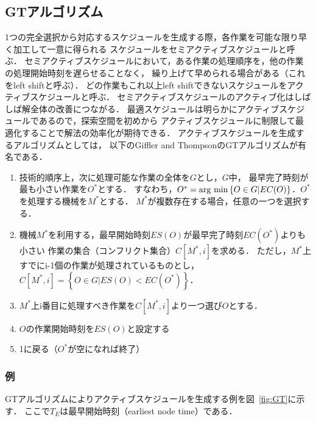 \documentclass{jsarticle}
\newcommand{\argmin}{\mathop{\rm arg~min}\limits}
\begin{document}
\subsection{GTアルゴリズム}
1つの完全選択から対応するスケジュールを生成する際，各作業を可能な限り早く加工して一意に得られる
スケジュールをセミアクティブスケジュールと呼ぶ．
セミアクティブスケジュールにおいて，ある作業の処理順序を，他の作業の処理開始時刻を遅らせることなく，
繰り上げて早められる場合がある（これをleft shiftと呼ぶ）．
どの作業もこれ以上left shiftできないスケジュールをアクティブスケジュールと呼ぶ．
セミアクティブスケジュールのアクティブ化はしばしば解全体の改善につながる．
最適スケジュールは明らかにアクティブスケジュールであるので，探索空間を初めから
アクティブスケジュールに制限して最適化することで解法の効率化が期待できる．
アクティブスケジュールを生成するアルゴリズムとしては，
以下のGiffler and ThompsonのGTアルゴリズムが有名である．
\begin{enumerate}
	\item 技術的順序上，次に処理可能な作業の全体を$G$とし，$G$中，
		最早完了時刻が最も小さい作業を$O^*$とする．
		すなわち，$O^*=\argmin \left\{O\in G|EC(O) \right\}$．$O^*$を処理する機械を$M^*$とする．
		$M^*$が複数存在する場合，任意の一つを選択する．
	\item 機械$M^*$を利用する，最早開始時刻$ES(O)$が最早完了時刻$EC(O^*)$よりも小さい
		作業の集合（コンフリクト集合）$C[M^*,i]$を求める．
		ただし，$M^*$上すでにi-1個の作業が処理されているものとし，
		$C[M^*,i]= \left\{O\in G|ES(O)<EC(O^*) \right\}$．
	\item $M^*$上i番目に処理すべき作業を$C[M^*,i]$より一つ選び$O$とする．
	\item $O$の作業開始時刻を$ES(O)$と設定する
	\item 1に戻る（$O^*$が空になれば終了）
\end{enumerate}

\subsubsection{例}
GTアルゴリズムによりアクティブスケジュールを生成する例を図~\ref{fig:GT}に示す．
ここで$T_E$は最早開始時刻（earliest node time）である．
\end{document}
